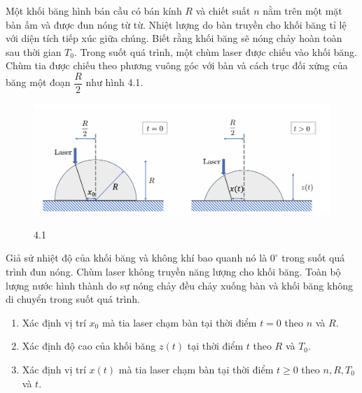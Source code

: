 \noindent Một khối băng hình bán cầu có bán kính $R$ và chiết suất $n$ nằm trên một mặt bàn ấm và được đun nóng từ từ. Nhiệt lượng do bàn truyền cho khối băng tỉ lệ với diện tích tiếp xúc giữa chúng. Biết rằng khối băng sẽ nóng chảy hoàn toàn sau thời gian $T_0$. Trong suốt quá trình, một chùm laser được chiếu vào khối băng. Chùm tia được chiếu theo phương vuông góc với bàn và cách trục đối xứng của băng một đoạn $\dfrac{R}{2}$ như hình 4.1.\\
\begin{figure}[h]
  \centering
  \includegraphics[width=1\textwidth]{Figures/Problems/Fig 4.1.png}
  \begin{center}
    \figurename{ 4.1}
  \end{center}
\end{figure}

\indent Giả sử nhiệt độ của khối băng và không khí bao quanh nó là $0^\circ$ trong suốt quá trình đun nóng. Chùm laser không truyền năng lượng cho khối băng. Toàn bộ lượng nước hình thành do sự nóng chảy đều chảy xuống bàn và khối băng không di chuyển trong suốt quá trình.
\begin{enumerate}
  \item Xác định vị trí $x_0$ mà tia laser chạm bàn tại thời điểm $t=0$ theo $n$ và $R$.
  \item Xác định độ cao của khối băng $z(t)$ tại thời điểm $t$ theo $R$ và $T_0$.
  \item Xác định vị trí $x(t)$ mà tia laser chạm bàn tại thời điểm $t\geqslant0$ theo $n, R, T_0$ và $t$.
\end{enumerate}